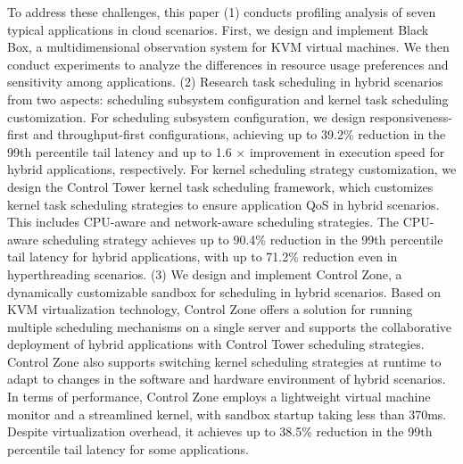To address these challenges, this paper (1) conducts profiling analysis of seven typical applications in cloud scenarios. First, we design and implement Black Box, a multidimensional observation system for KVM virtual machines. We then conduct experiments to analyze the differences in resource usage preferences and sensitivity among applications. (2) Research task scheduling in hybrid scenarios from two aspects: scheduling subsystem configuration and kernel task scheduling customization. For scheduling subsystem configuration, we design responsiveness-first and throughput-first configurations, achieving up to 39.2\% reduction in the 99th percentile tail latency and up to 1.6 $\times$ improvement in execution speed for hybrid applications, respectively. For kernel scheduling strategy customization, we design the Control Tower kernel task scheduling framework, which customizes kernel task scheduling strategies to ensure application QoS in hybrid scenarios. This includes CPU-aware and network-aware scheduling strategies. The CPU-aware scheduling strategy achieves up to 90.4\% reduction in the 99th percentile tail latency for hybrid applications, with up to 71.2\% reduction even in hyperthreading scenarios. (3) We design and implement Control Zone, a dynamically customizable sandbox for scheduling in hybrid scenarios. Based on KVM virtualization technology, Control Zone offers a solution for running multiple scheduling mechanisms on a single server and supports the collaborative deployment of hybrid applications with Control Tower scheduling strategies. Control Zone also supports switching kernel scheduling strategies at runtime to adapt to changes in the software and hardware environment of hybrid scenarios. In terms of performance, Control Zone employs a lightweight virtual machine monitor and a streamlined kernel, with sandbox startup taking less than 370ms. Despite virtualization overhead, it achieves up to 38.5\% reduction in the 99th percentile tail latency for some applications.


\pagestyle{enfrontmatterstyle}%
\cleardoublepage\pagestyle{frontmatterstyle}%

